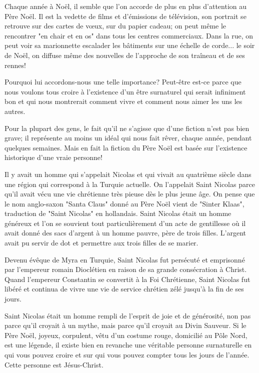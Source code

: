 
Chaque année à Noël, il semble que l'on accorde de plus en plus d'attention au Père Noël. Il est la vedette de films et d'émissions de télévision, son portrait se retrouve sur des cartes de vœux, sur du papier cadeau; on peut même le rencontrer "en chair et en os" dans tous les centres commerciaux. Dans la rue, on peut voir sa marionnette escalader les bâtiments sur une échelle de corde... le soir de Noël, on diffuse même des nouvelles de l'approche de son traîneau et de ses rennes!

Pourquoi lui accordons-nous une telle importance? Peut-être est-ce parce que nous voulons tous croire à l'existence d'un être surnaturel qui serait infiniment bon et qui nous montrerait comment vivre et comment nous aimer les uns les autres.

Pour la plupart des gens, le fait qu'il ne s'agisse que d'une fiction n'est pas bien grave; il représente au moins un idéal qui nous fait rêver, chaque année, pendant quelques semaines. Mais en fait la fiction du Père Noël est basée sur l'existence historique d'une vraie personne!

Il y avait un homme qui s'appelait Nicolas et qui vivait au quatrième siècle dans une région qui correspond à la Turquie actuelle. On l'appelait Saint Nicolas parce qu'il avait vécu une vie chrétienne très pieuse dès le plus jeune âge. On pense que le nom anglo-saxon "Santa Claus" donné au Père Noël vient de "Sinter Klaas", traduction de "Saint Nicolas" en hollandais. Saint Nicolas était un homme généreux et l'on se souvient tout particulièrement d'un acte de gentillesse où il avait donné des sacs d'argent à un homme pauvre, père de trois filles. L'argent avait pu servir de dot et permettre aux trois filles de se marier.

Devenu évêque de Myra en Turquie, Saint Nicolas fut persécuté et emprisonné par l'empereur romain Dioclétien en raison de sa grande consécration à Christ. Quand l'empereur Constantin se convertit à la Foi Chrétienne, Saint Nicolas fut libéré et continua de vivre une vie de service chrétien zélé jusqu'à la fin de ses jours.

Saint Nicolas était un homme rempli de l'esprit de joie et de générosité, non pas parce qu'il croyait à un mythe, mais parce qu'il croyait au Divin Sauveur. Si le Père Noël, joyeux, corpulent, vêtu d'un costume rouge, domicilié au Pôle Nord, est une légende, il existe bien en revanche une véritable personne surnaturelle en qui vous pouvez croire et sur qui vous pouvez compter tous les jours de l'année. Cette personne est Jésus-Christ.


